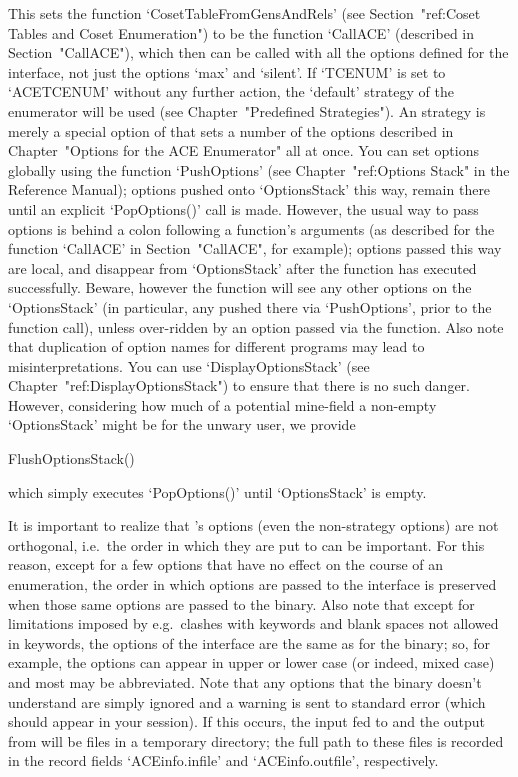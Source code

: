 This sets the function `CosetTableFromGensAndRels' (see 
Section~"ref:Coset Tables and Coset Enumeration")  to be the  function
`CallACE'  (described in Section~"CallACE"),  which then can be called 
with all the options defined for the {\ACE} interface,  not  just  the
options `max' and `silent'. If `TCENUM' is set to `ACETCENUM'  without
any further action,  the  `default' strategy of the {\ACE}  enumerator 
will be used (see Chapter~"Predefined Strategies"). An {\ACE} strategy
is merely a special option of {\ACE} that sets a number of the options
described in Chapter~"Options for the ACE Enumerator" all at once. You
can  set  options  globally  using  the  function  `PushOptions'  (see
Chapter~"ref:Options Stack" in the {\GAP} Reference  Manual);  options
pushed onto `OptionsStack'  this way,  remain there until an  explicit
`PopOptions()' call is made.  However,  the  usual way to pass options 
is behind a colon following a function's arguments   (as described for
the  function `CallACE' in Section~"CallACE",  for  example);  options
passed this way are local, and disappear from `OptionsStack' after the
function has executed successfully.  Beware, however the function will
see any other options on the `OptionsStack' (in particular, any pushed
there via `PushOptions', prior to the function call), unless over-ridden 
by an option passed via the function.  Also  note that duplication  of
option  names  for  different programs may lead to misinterpretations. 
You can use `DisplayOptionsStack' (see Chapter~"ref:DisplayOptionsStack") 
to ensure that there is no such danger. However, considering how much
of a potential mine-field a non-empty `OptionsStack' might be for the
unwary user, we provide

\>FlushOptionsStack()

which  simply  executes `PopOptions()' until `OptionsStack' is empty.

It is important to realize that {\ACE}'s options (even the non-strategy 
options) are not orthogonal, i.e.\ the order in which they are put to
{\ACE} can be important.  For this reason,  except for a  few options
that have no effect on the course of an  enumeration,  the  order  in
which  options  are passed to the {\ACE} interface is preserved  when 
those same options are passed to the {\ACE} binary.  Also  note  that
except for limitations imposed  by {\GAP}  e.g.\ clashes  with {\GAP}
keywords and blank spaces not allowed in keywords, the options of the
{\ACE} interface are the same as for the binary; so, for example, the
options can appear in upper or lower case (or indeed, mixed case) and
most may be abbreviated. Note that any options that the {\ACE} binary
doesn't  understand  are  simply  ignored  and  a  warning is sent to 
standard error (which should appear in your {\GAP} session).  If this
occurs,  the  input fed to  {\ACE} and the output from {\ACE} will be
files in a  temporary directory;  the full path  to  these  files  is
recorded in the record fields `ACEinfo.infile' and `ACEinfo.outfile',
respectively.

